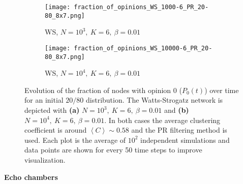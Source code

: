 \documentclass[11 pt , letterpaper , twoside , openright]{book}
\begin{document}
\begin{figure}[H]
  \begin{subfigure}[b]{0.49\textwidth}
  	\texttt{[image: fraction\_of\_opinions\_WS\_1000-6\_PR\_20-80\_8x7.png]}
    \caption{WS, $N = 10^3,\ K=6,\ \beta=0.01$}
    \label{ws1000}
  \end{subfigure}
  \begin{subfigure}[b]{0.49\textwidth}
  	\texttt{[image: fraction\_of\_opinions\_WS\_10000-6\_PR\_20-80\_8x7.png]}
    \caption{WS, $N = 10^4,\ K=6,\ \beta=0.01$}
    \label{ws10000}
  \end{subfigure}
  \captionsetup{format=plain}
  \caption[Evolution of the fraction of nodes with opinion 0 ($P_0(t)$) over time for an initial $20/80$ opinion distribution for a WS model with $N=10^3$ or $N=10^4$, $K=6$ and $\beta = 0.01$, PR]{Evolution of the fraction of nodes with opinion 0 ($P_0(t)$) over time for an initial $20/80$ distribution. The Watts-Strogatz network is depicted with \textbf{(a)} $N=10^3,\ K=6,\ \beta=0.01$ and \textbf{(b)} $N=10^4,\ K=6,\ \beta=0.01$. In both cases the average clustering coefficient is around $\left<C\right> \sim 0.58$ and the PR filtering method is used. Each plot is the average of $10^2$ independent simulations and data points are shown for every 50 time steps to improve visualization.}
\label{ev_op_WS_k=6}
\end{figure}
\newpage
\noindent
\textbf{Echo chambers}\\
\end{document}
